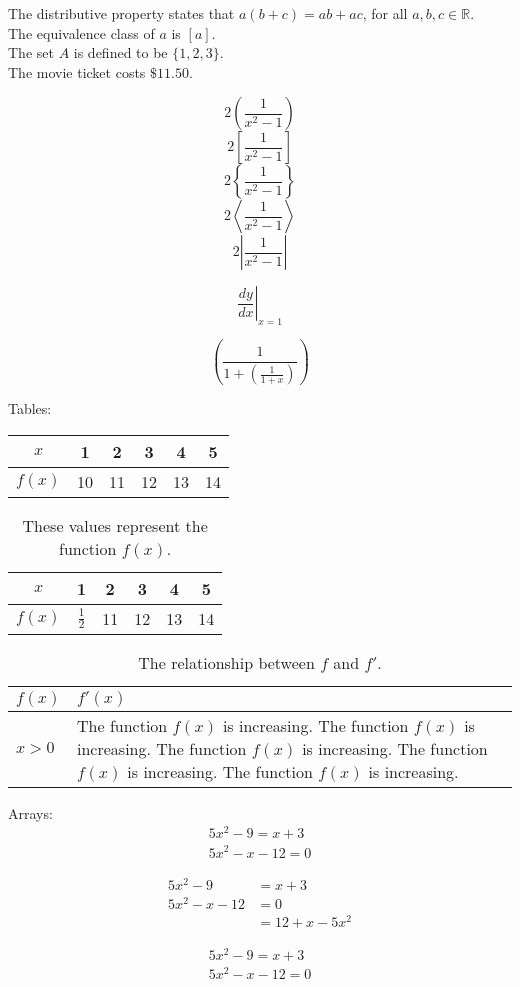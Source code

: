 \documentclass[11pt]{article}
\begin{document}
The distributive property states that $a(b+c)=ab+ac$, for all $a, b, c \in \mathbb{R}$. \\[6pt]
The equivalence class of $a$ is $[a]$.\\[6pt]
The set $A$ is defined to be $\{1, 2, 3\}$.\\[6pt]
The movie ticket costs $\$11.50$. 

$$2\left(\frac{1}{x^2-1}\right)$$
$$2\left[\frac{1}{x^2-1}\right]$$
$$2\left\{\frac{1}{x^2-1}\right\}$$
$$2\left \langle      \frac{1}{x^2-1}\right \rangle      $$
$$2\left | \frac{1}{x^2-1}\right |      $$

$$\left.\frac{dy}{dx}\right|_{x=1}$$

$$\left( \frac{1}{1+\left(\frac{1}{1+x}\right)} \right)$$


Tables:\\

\begin{tabular}{|c||c|c|c|c|c|}
\hline
$x$ & 1 & 2 & 3 & 4 & 5 \\ \hline
$f(x)$ & 10 & 11 & 12 & 13 & 14 \\ \hline
\end{tabular}

\vspace{1cm}


\begin{table}[H]
\centering
\def\arraystretch{1.5}
\begin{tabular}{|c||c|c|c|c|c|}
\hline
$x$ & 1 & 2 & 3 & 4 & 5 \\ \hline
$f(x)$ & $\frac{1}{2}$ & 11 & 12 & 13 & 14 \\ \hline
\end{tabular}
\caption{These values represent the function $f(x)$.}
\end{table}


\begin{table}[H]
\centering
\caption{The relationship between $f$ and $f'$.}
\def\arraystretch{1.5}
\begin{tabular}{|l|p{3in}|}
\hline
$f(x)$ & $f'(x)$ \\ \hline
$x>0$ & The function $f(x)$ is increasing. The function $f(x)$ is increasing. The function $f(x)$ is increasing. The function $f(x)$ is increasing. The function $f(x)$ is increasing. \\ \hline
\end{tabular}
\end{table}


Arrays:
\begin{align}
5x^2-9=x+3\\
5x^2-x-12=0
\end{align}

\begin{align*}
5x^2-9&=x+3\\
5x^2-x-12&=0\\
&=12+x-5x^2
\end{align*}

\begin{align}
5x^2-9=x+3\\
5x^2-x-12=0
\end{align}
\end{document}
